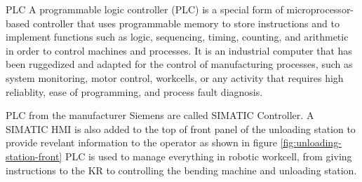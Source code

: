PLC
A programmable logic controller (PLC) is a special form of microprocessor-based controller that uses programmable memory to store 
instructions and to implement functions such as logic, sequencing, timing, counting, and arithmetic in order to control machines and processes. \cite[page 5]{bolton2015programmable}
It is an industrial computer that has been ruggedized and adapted for the control of manufacturing processes, 
such as system monitoring, motor control, workcells, or any activity that requires high reliablity, ease of programming, and process fault diagnosis. \cite{ALPHONSUS20161185}

PLC from the manufacturer Siemens are called SIMATIC Controller. \cite{siemens} A SIMATIC HMI is also added to the top of front panel of the unloading station to provide
revelant information to the operator as shown in figure \ref{fig:unloading-station-front} PLC is used to manage everything in robotic workcell,
from giving instructions to the KR to controlling the bending machine and unloading station.